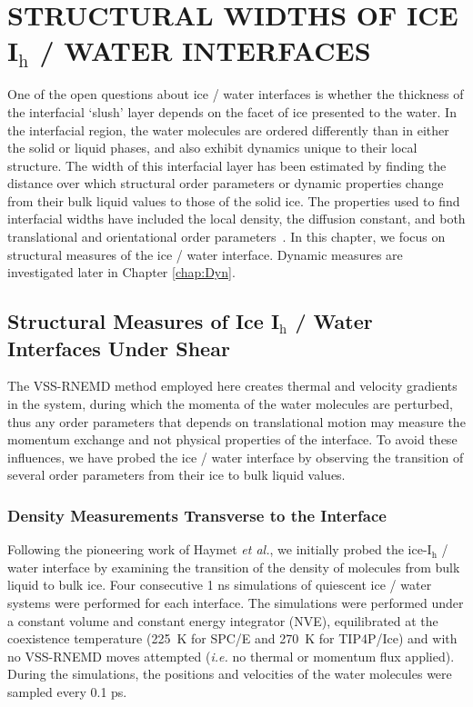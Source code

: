 
\chapter{STRUCTURAL WIDTHS OF ICE I$_\mathrm{h}$ / WATER INTERFACES}
One of the open questions about ice / water interfaces is whether the
thickness of the interfacial `slush' layer depends on the facet of ice
presented to the water. In the interfacial region, the water molecules
are ordered differently than in either the solid or liquid phases, and
also exhibit dynamics unique to their local structure.  The width of
this interfacial layer has been estimated by finding the distance over
which structural order parameters or dynamic properties change from
their bulk liquid values to those of the solid ice. The properties
used to find interfacial widths have included the local density, the
diffusion constant, and both translational and orientational order
parameters~\cite{Karim1988,Karim1990,Hayward2001,Hayward2002,Bryk2002,Gay2002,Louden2013a}. In
this chapter, we focus on structural measures of the ice / water
interface. Dynamic measures are investigated later in Chapter \ref{chap:Dyn}.

\section{Structural Measures of Ice I$_\mathrm{h}$ / Water Interfaces
  Under Shear}\label{structure}
The VSS-RNEMD method employed here creates thermal and velocity
gradients in the system, during which the momenta of the water
molecules are perturbed, thus any order parameters that depends on
translational motion may measure the momentum exchange and not
physical properties of the interface. To avoid these influences, we
have probed the ice / water interface by observing the transition of
several order parameters from their ice to bulk liquid values. 


\subsection{Density Measurements Transverse to the Interface}
Following the pioneering work of Haymet \textit{et al.}, we initially
probed the ice-I$_\mathrm{h}$ / water interface by examining the
transition of the density of molecules from bulk liquid to bulk
ice. Four consecutive 1 ns simulations of quiescent ice / water
systems were performed for each interface. The simulations were
performed under a constant volume and constant energy integrator
(NVE), equilibrated at the coexistence temperature (225~K for SPC/E
and 270~K for TIP4P/Ice) and with no VSS-RNEMD moves attempted
(\textit{i.e.} no thermal or momentum flux applied). During the
simulations, the positions and velocities of the water molecules were
sampled every 0.1 ps.


